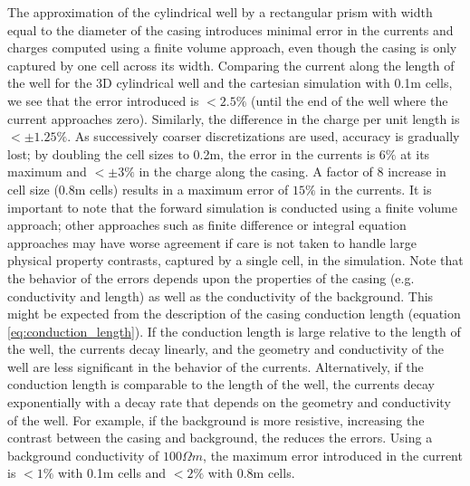 

The approximation of the cylindrical well by a rectangular prism with width equal to the diameter of the casing introduces minimal error in the currents and charges computed using a finite volume approach, even though the casing is only captured by one cell across its width. Comparing the current along the length of the well for the 3D cylindrical well and the cartesian simulation with 0.1m cells, we see that the error introduced is $< 2.5\%$ (until the end of the well where the current approaches zero). Similarly, the difference in the charge per unit length is $< \pm 1.25\%$. As successively coarser discretizations are used, accuracy is gradually lost; by doubling the cell sizes to 0.2m, the error in the currents is $6\%$ at its maximum and $< \pm 3\%$ in the charge along the casing. A factor of 8 increase in cell size (0.8m cells) results in a maximum error of $15\%$ in the currents. It is important to note that the forward simulation is conducted using a finite volume approach; other approaches such as finite difference or integral equation approaches may have worse agreement if care is not taken to handle large physical property contrasts, captured by a single cell, in the simulation.
Note that the behavior of the errors depends upon the properties of the casing (e.g. conductivity and length) as well as the conductivity of the background. This might be expected from the description of the casing conduction length (equation \ref{eq:conduction_length}). If the conduction length is large relative to the length of the well, the currents decay linearly, and the geometry and conductivity of the well are less significant in the behavior of the currents. Alternatively, if the conduction length is comparable to the length of the well, the currents decay exponentially with a decay rate that depends on the geometry and conductivity of the well. For example, if the background is more resistive, increasing the contrast between the casing and background, the reduces the errors. Using a background conductivity of $100 \Omega m$, the maximum error introduced in the current is $< 1\%$ with 0.1m cells and $< 2\%$ with 0.8m cells.

